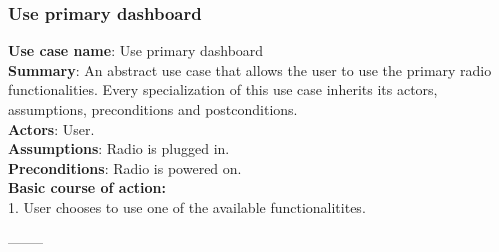 \documentclass[11pt]{article}
\begin{document}
\subsubsection{Use primary dashboard}
\textbf{Use case name}: Use primary dashboard\\
\textbf{Summary}: An abstract use case that allows the user to use the primary radio functionalities. Every specialization of this use case inherits its actors, assumptions, preconditions and postconditions.\\
\textbf{Actors}: User.\\
\textbf{Assumptions}: Radio is plugged in.\\
\textbf{Preconditions}: Radio is powered on.\\
\textbf{Basic course of action:}\\
\hspace*{10mm}1. User chooses to use one of the available functionalitites.
\begin{center}--------\end{center}
\end{document}
